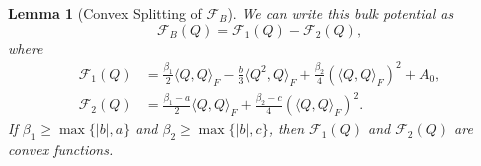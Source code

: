 \documentclass[10pt,letterpaper]{amsart}
\newtheorem{lemma}{Lemma}[section]
\theoremstyle{definition}{\newtheorem{definition}[lemma]{Definition}}
\theoremstyle{note}{\newtheorem{claim}{Claim}[section]
\newtheorem*{claim*}{Claim}}
\numberwithin{equation}{section}
\begin{document}
\begin{lemma}[Convex Splitting of $\mathcal{F}_B$]
We can write this bulk potential as
\[
    \mathcal{F}_B(Q) = \mathcal{F}_1(Q) - \mathcal{F}_2(Q),
\]
where
\begin{equation*}
    \begin{split}
        \mathcal{F}_1(Q) &= \frac{\beta_1}{2}\langle Q, Q\rangle_F - \frac{b}{3}\langle Q^2, Q\rangle_F + \frac{\beta_2}{4}(\langle Q, Q\rangle_F)^2 + A_0,\\
        \mathcal{F}_2(Q) &= \frac{\beta_1 - a}{2}\langle Q, Q\rangle_F + \frac{\beta_2-c}{4}(\langle Q, Q\rangle_F)^2.
    \end{split}
\end{equation*}
If $\beta_1 \ge \max\{|b|,a\}$ and $\beta_2\ge\max\{|b|,c\}$, then $\mathcal{F}_1(Q)$ and $\mathcal{F}_2(Q)$ are convex functions.
\end{lemma}
\end{document}
